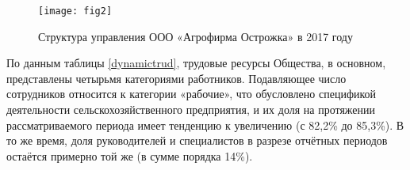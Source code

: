 \begin{figure}[!h]
	\centering
	\texttt{[image: fig2]}
	\caption{Структура управления ООО «Агрофирма Острожка» в 2017 году}
	\label{fig:fig1}
\end{figure}



По данным таблицы \ref{dynamictrud}, трудовые ресурсы Общества, в основном, представлены четырьмя категориями работников. Подавляющее число сотрудников относится к категории «рабочие», что обусловлено спецификой деятельности сельскохозяйственного предприятия, и их доля на протяжении рассматриваемого периода имеет тенденцию к увеличению (с 82,2\% до 85,3\%). В то же время, доля руководителей и специалистов в разрезе отчётных периодов остаётся примерно той же (в сумме порядка 14\%).

